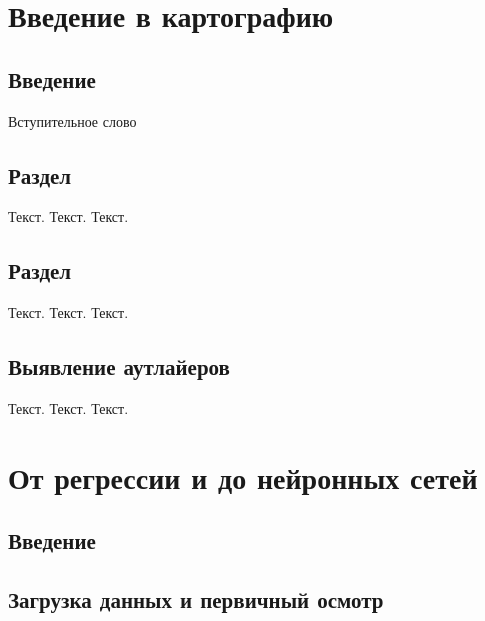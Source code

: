 \documentclass[
  letterpaper,
  DIV=11,
  numbers=noendperiod]{scrreprt}
\begin{document}

\chapter{Введение в
картографию}\label{ux432ux432ux435ux434ux435ux43dux438ux435-ux432-ux43aux430ux440ux442ux43eux433ux440ux430ux444ux438ux44e}

\section{Введение}\label{ux432ux432ux435ux434ux435ux43dux438ux435-1}

Вступительное слово

\section{Раздел}\label{ux440ux430ux437ux434ux435ux43b}

Текст. Текст. Текст.

\section{Раздел}\label{ux440ux430ux437ux434ux435ux43b-1}

Текст. Текст. Текст.

\section{Выявление
аутлайеров}\label{ux432ux44bux44fux432ux43bux435ux43dux438ux435-ux430ux443ux442ux43bux430ux439ux435ux440ux43eux432}

Текст. Текст. Текст.


\chapter{От регрессии и до нейронных
сетей}\label{ux43eux442-ux440ux435ux433ux440ux435ux441ux441ux438ux438-ux438-ux434ux43e-ux43dux435ux439ux440ux43eux43dux43dux44bux445-ux441ux435ux442ux435ux439}

\section{Введение}\label{ux432ux432ux435ux434ux435ux43dux438ux435-2}

\section{Загрузка данных и первичный
осмотр}\label{ux437ux430ux433ux440ux443ux437ux43aux430-ux434ux430ux43dux43dux44bux445-ux438-ux43fux435ux440ux432ux438ux447ux43dux44bux439-ux43eux441ux43cux43eux442ux440-1}
\end{document}
